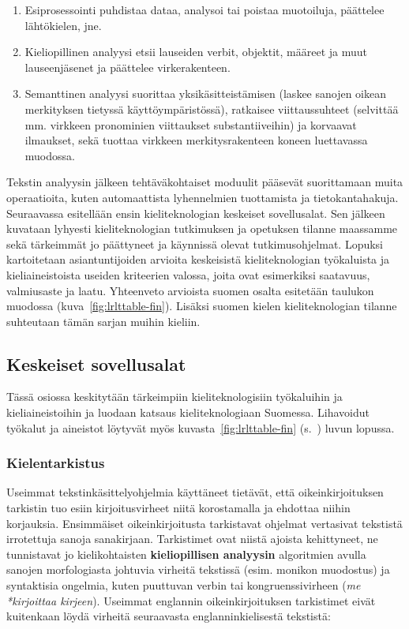 \begin{multicols}{2}
\begin{enumerate}
\item Esiprosessointi puhdistaa dataa, analysoi tai poistaa muotoiluja,
 päättelee lähtökielen, jne.

\item Kieliopillinen analyysi etsii lauseiden verbit, objektit,
määreet ja muut lauseenjäsenet ja päättelee virkerakenteen.

\item Semanttinen analyysi suorittaa yksikäsitteistämisen (laskee
sanojen oikean merkityksen tietyssä käyttöympäristössä), ratkaisee
viittaussuhteet (selvittää mm. virkkeen pronominien viittaukset
substantiiveihin) ja korvaavat ilmaukset, sekä tuottaa virkkeen
merkitysrakenteen koneen luettavassa muodossa.
\end{enumerate}

Tekstin analyysin jälkeen tehtäväkohtaiset moduulit pääsevät
suorittamaan muita operaatioita, kuten automaattista lyhennelmien
tuottamista ja tietokantahakuja.\\
Seuraavassa esitellään ensin kieliteknologian keskeiset sovellusalat.
Sen jälkeen kuvataan lyhyesti kieliteknologian tutkimuksen ja
opetuksen tilanne maassamme sekä tärkeimmät jo päättyneet ja käynnissä
olevat tutkimusohjelmat. Lopuksi kartoitetaan asiantuntijoiden
arvioita keskeisistä kieliteknologian työkaluista ja kieliaineistoista
useiden kriteerien valossa, joita ovat esimerkiksi saatavuus,
valmiusaste ja laatu. Yhteenveto arvioista suomen osalta esitetään
taulukon muodossa (kuva~\ref{fig:lrlttable-fin}). Lisäksi suomen
kielen kieliteknologian tilanne suhteutaan tämän sarjan muihin
kieliin.


\subsection{Keskeiset sovellusalat}


Tässä osiossa keskitytään tärkeimpiin kieliteknologisiin työkaluihin
ja kieliaineistoihin ja luodaan katsaus kieliteknologiaan Suomessa.
Lihavoidut työkalut ja aineistot löytyvät myös
kuvasta~\ref{fig:lrlttable-fin} (s.~\pageref{fig:lrlttable-fin}) luvun
lopussa.



\subsubsection{Kielentarkistus}

Useimmat tekstinkäsittelyohjelmia käyttäneet tietävät, että oikeinkirjoituksen 
tarkistin tuo esiin kirjoitusvirheet niitä korostamalla ja ehdottaa niihin
korjauksia. Ensimmäiset oikeinkirjoitusta tarkistavat ohjelmat
vertasivat tekstistä irrotettuja sanoja sanakirjaan. Tarkistimet ovat niistä ajoista 
kehittyneet, ne tunnistavat jo kielikohtaisten \textbf{kieliopillisen analyysin}
algoritmien avulla sanojen morfologiasta johtuvia virheitä tekstissä 
(esim. monikon muodostus) ja syntaktisia ongelmia, kuten
puuttuvan verbin tai kongruenssivirheen (\textit{me *kirjoittaa
kirjeen}). Useimmat englannin oikeinkirjoituksen tarkistimet eivät kuitenkaan
löydä virheitä seuraavasta englanninkielisestä tekstistä:


\end{multicols}
